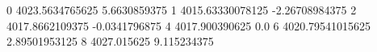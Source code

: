 0 4023.5634765625 5.6630859375
1 4015.63330078125 -2.26708984375
2 4017.8662109375 -0.0341796875
4 4017.900390625 0.0
6 4020.79541015625 2.89501953125
8 4027.015625 9.115234375
